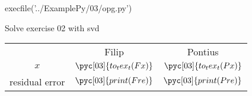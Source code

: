\documentclass[../main.tex]{subfiles}
\begin{document}
\begin{pycode}[03]
execfile('../ExamplePy/03/opg.py')
\end{pycode}

Solve exercise 02 with svd\\

\begin{table}[h]
	\centering
		\begin{tabular}{ccc}
			&Filip & Pontius\\
			$x$&
			$\pyc[03]{to_tex_t(Fx)}$ &
			$\pyc[03]{to_tex_t(Px)}$ \\
			residual error &
			$\pyc[03]{print(Fre)}$ &
			$\pyc[03]{print(Pre)}$ \\

		\end{tabular}
\end{table}

\inputminted{python}{'../ExamplePy/03/opg.py'}
	
\end{document}
